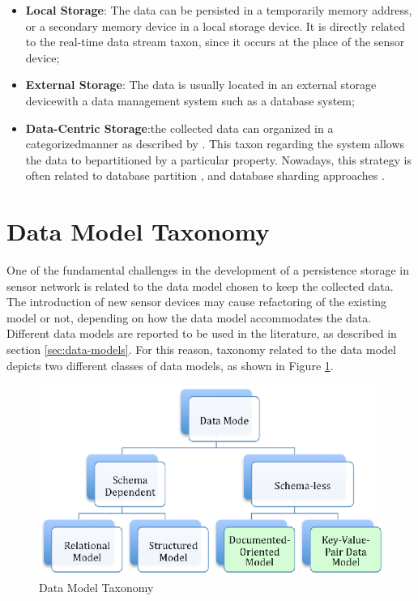 \begin{itemize}
  \item \textbf{Local Storage}: The data can be persisted in a temporarily
  memory address, or a secondary memory device in a local storage device. It is
  directly related to the real-time data stream taxon, since it occurs at the
  place of the sensor device;
  \item \textbf{External Storage}: The data is usually located in an external
  storage devicewith a data management system such as a database system;
  \item \textbf{Data-Centric Storage}:the collected data can organized in a
  categorizedmanner as described by \cite{sn-storage03}. This taxon regarding
  the system allows the data to bepartitioned by a particular property.
  Nowadays, this strategy is often related to database partition
  \cite{db-partition}, and database sharding approaches \cite{db-shard-intro,
  db-shard-discussion}.
\end{itemize}

\section{Data Model Taxonomy}

One of the fundamental challenges in the development of a persistence storage
in sensor network is related to the data model chosen to keep the collected
data. The introduction of new sensor devices may cause refactoring of the
existing model or not, depending on how the data model accommodates the data.
Different data models are reported to be used in the literature, as described
in section \ref{sec:data-models}. For this reason, taxonomy related to the
data model depicts two different classes of data models, as shown in Figure
\ref{fig:taxonomy-data-model}.

\begin{figure}[h]
  \centering
  \includegraphics{../diagrams/taxonomy-data-model}
  \caption{Data Model Taxonomy}
  \label{fig:taxonomy-data-model}
\end{figure}

